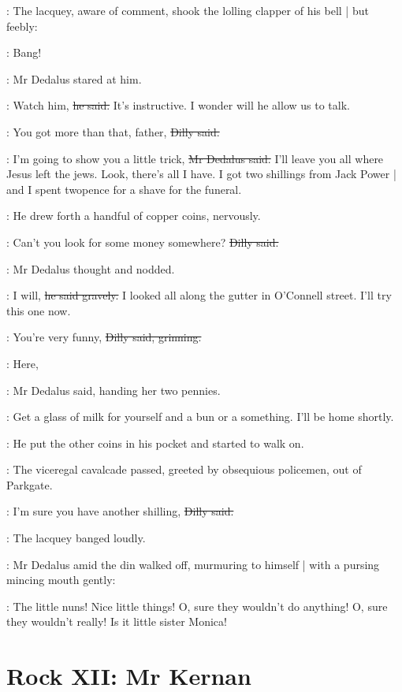 :
The lacquey,
aware of comment,
shook the lolling clapper of his bell |
but feebly:

\bell:
Bang!

:
Mr Dedalus stared at him.

\simon:
Watch him,
\sout{he said.}
It's instructive.
I wonder will he allow us to talk.

\dilly:
You got more than that, father,
\sout{Dilly said.}

\simon:
I'm going to show you a little trick,
\sout{Mr Dedalus said.}
I'll leave you all where Jesus left the jews.
Look, there's all I have.
I got two shillings from Jack Power |
and I spent twopence for a shave for the funeral.

:
He drew forth a handful of copper coins,
nervously.

\dilly:
Can't you look for some money somewhere?
\sout{Dilly said.}

:
Mr Dedalus thought and nodded.

\simon:
I will,
\sout{he said gravely.}
I looked all along the gutter in O'Connell street.
I'll try this one now.

\dilly:
You're very funny,
\sout{Dilly said, grinning.}

\simon:
Here,

:
Mr Dedalus said,
handing her two pennies.

\simon:
Get a glass of milk for yourself
and a bun or a something.
I'll be home shortly.

:
He put the other coins in his pocket and started to walk on.

\begin{mdframed}
    :
    The viceregal cavalcade passed,
    greeted by obsequious policemen,
    out of Parkgate.%
\end{mdframed}

\dilly:
I'm sure you have another shilling,
\sout{Dilly said.}

:
The lacquey banged loudly.

:
Mr Dedalus amid the din walked off,
murmuring to himself |
with a pursing mincing mouth gently:

\simon:
The little nuns!
Nice little things!
O, sure they wouldn't do anything!
O, sure they wouldn't really!
Is it little sister Monica!


\section*{Rock XII: Mr Kernan}


